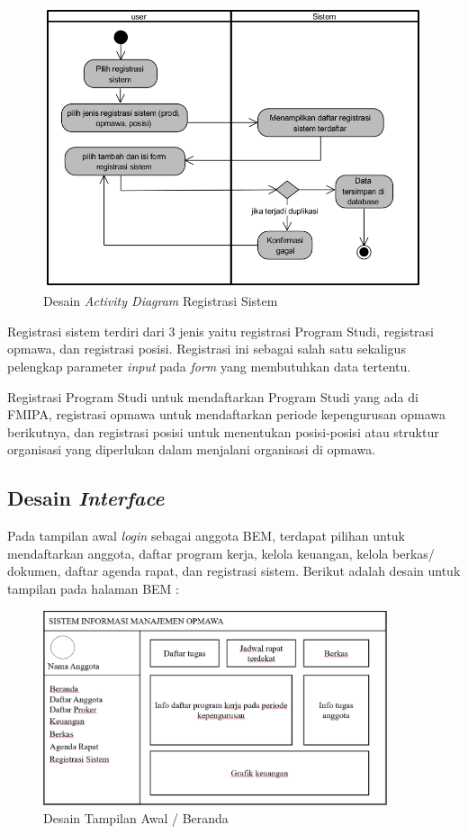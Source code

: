 \begin{figure}[H]
	\centering
	\includegraphics[width=1.0\textwidth]{gambar/Activitysistem}
	\caption{Desain \textit{Activity Diagram} Registrasi Sistem}
	\label{ActivitySistem_diagram}
\end{figure}

Registrasi sistem terdiri dari 3 jenis yaitu registrasi Program Studi, registrasi opmawa, dan registrasi posisi. Registrasi ini sebagai salah satu sekaligus pelengkap parameter \textit{input} pada \textit{form} yang membutuhkan data tertentu.

Registrasi Program Studi untuk mendaftarkan Program Studi yang ada di FMIPA, registrasi opmawa untuk mendaftarkan periode kepengurusan opmawa berikutnya, dan registrasi posisi untuk menentukan posisi-posisi atau struktur organisasi yang diperlukan dalam menjalani organisasi di opmawa.


\subsection{Desain \textit{Interface}}

Pada tampilan awal \textit{login} sebagai anggota BEM, terdapat pilihan untuk mendaftarkan anggota, daftar program kerja, kelola keuangan, kelola berkas/ dokumen, daftar agenda rapat, dan registrasi sistem. Berikut adalah desain untuk tampilan pada halaman BEM :

\begin{figure}[H]
	\centering
	\includegraphics[width=0.9\textwidth]{gambar/tampilanberanda}
	\caption{Desain Tampilan Awal / Beranda}
	\label{Tampilan_beranda}
\end{figure}

